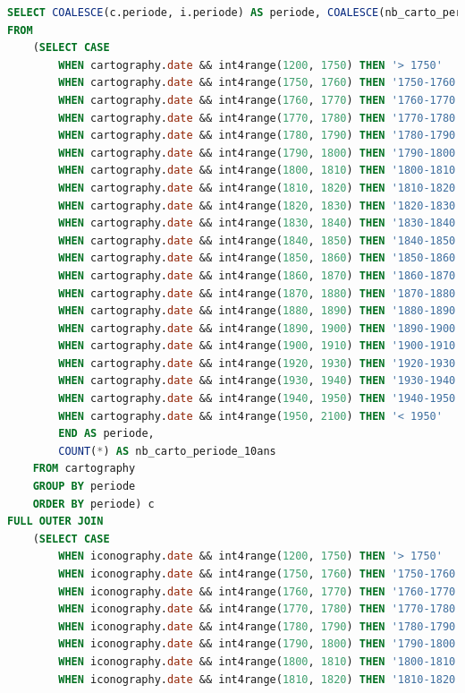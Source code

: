\begin{lstlisting}[language=SQL, caption=Requête SQL pour nombre de sources par date (10 ans)]
SELECT COALESCE(c.periode, i.periode) AS periode, COALESCE(nb_carto_periode_10ans, 0) AS nb_carto_periode_10ans, COALESCE(nb_icono_periode_10ans, 0) AS nb_icono_periode_10ans
FROM 
    (SELECT CASE 
        WHEN cartography.date && int4range(1200, 1750) THEN '> 1750' 
        WHEN cartography.date && int4range(1750, 1760) THEN '1750-1760' 
        WHEN cartography.date && int4range(1760, 1770) THEN '1760-1770' 
        WHEN cartography.date && int4range(1770, 1780) THEN '1770-1780' 
        WHEN cartography.date && int4range(1780, 1790) THEN '1780-1790' 
        WHEN cartography.date && int4range(1790, 1800) THEN '1790-1800' 
        WHEN cartography.date && int4range(1800, 1810) THEN '1800-1810' 
        WHEN cartography.date && int4range(1810, 1820) THEN '1810-1820' 
        WHEN cartography.date && int4range(1820, 1830) THEN '1820-1830' 
        WHEN cartography.date && int4range(1830, 1840) THEN '1830-1840' 
        WHEN cartography.date && int4range(1840, 1850) THEN '1840-1850' 
        WHEN cartography.date && int4range(1850, 1860) THEN '1850-1860' 
        WHEN cartography.date && int4range(1860, 1870) THEN '1860-1870' 
        WHEN cartography.date && int4range(1870, 1880) THEN '1870-1880' 
        WHEN cartography.date && int4range(1880, 1890) THEN '1880-1890' 
        WHEN cartography.date && int4range(1890, 1900) THEN '1890-1900' 
        WHEN cartography.date && int4range(1900, 1910) THEN '1900-1910' 
        WHEN cartography.date && int4range(1920, 1930) THEN '1920-1930' 
        WHEN cartography.date && int4range(1930, 1940) THEN '1930-1940' 
        WHEN cartography.date && int4range(1940, 1950) THEN '1940-1950' 
        WHEN cartography.date && int4range(1950, 2100) THEN '< 1950' 
        END AS periode, 
        COUNT(*) AS nb_carto_periode_10ans
    FROM cartography 
    GROUP BY periode 
    ORDER BY periode) c
FULL OUTER JOIN 
    (SELECT CASE 
        WHEN iconography.date && int4range(1200, 1750) THEN '> 1750' 
        WHEN iconography.date && int4range(1750, 1760) THEN '1750-1760' 
        WHEN iconography.date && int4range(1760, 1770) THEN '1760-1770' 
        WHEN iconography.date && int4range(1770, 1780) THEN '1770-1780' 
        WHEN iconography.date && int4range(1780, 1790) THEN '1780-1790' 
        WHEN iconography.date && int4range(1790, 1800) THEN '1790-1800' 
        WHEN iconography.date && int4range(1800, 1810) THEN '1800-1810' 
        WHEN iconography.date && int4range(1810, 1820) THEN '1810-1820' 

\end{lstlisting}
